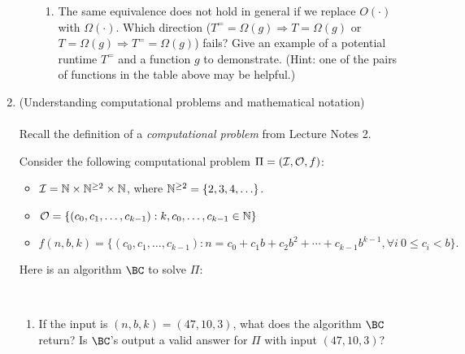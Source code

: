 \documentclass[11pt]{article}
\begin{document}
\begin{enumerate}
\begin{enumerate}
\begin{enumerate}
    

    \item The same equivalence does not hold in general if we replace $O(\cdot)$ with $\Omega(\cdot)$.  Which direction ($T^{=}=\Omega(g) \Rightarrow T=\Omega(g)$ or $T=\Omega(g) \Rightarrow T^{=}=\Omega(g)$) fails? Give an example of a potential runtime $T^{=}$ and a function $g$ to demonstrate.  (Hint: one of the pairs of functions in the table above may be helpful.)
    


 

    
    
    \end{enumerate}

 
    \end{enumerate}
    
    \newpage
    \item (Understanding computational problems and mathematical notation)\\\\
    Recall the definition of a {\em computational problem} from Lecture Notes 2.  \label{prob:BC}

 
    Consider the following computational problem $\Pi=(\mathcal{I},\mathcal{O},f)$: 
    \begin{itemize}                                
    \item $\mathcal{I} = \mathbb{N}\times\mathbb{N}^{\geq 2}\times \mathbb{N}$, where $\mathbb{N}^{\geq 2} = \{2,3,4,\ldots\}$.  
    \item $\mathcal{O} = \{(c_0,c_1,\ldots,c_{k-1}) : k,c_0,\ldots,c_{k-1}\in \mathbb{N}\}$
    \item $f(n,b,k) = \{ (c_0,c_1,\ldots,c_{k-1}) : n=c_0+c_1b+c_2b^2+\cdots+c_{k-1}b^{k-1}, \forall i\ 0\leq c_i< b\}.$ 
    \end{itemize}
Here is an algorithm $\BC$ to solve $\Pi$: 
    
\begin{algorithm}[H]
    \\
    {
    \lElse{\Return{$\bot$}}}
\end{algorithm}


\begin{enumerate}
\item If the input is $(n,b,k) = (47,10,3)$, what does the algorithm $\BC$ return? Is $\BC$'s output a valid answer for $\Pi$ with input $(47,10, 3)$?







\end{enumerate}
\end{enumerate}
\end{document}

